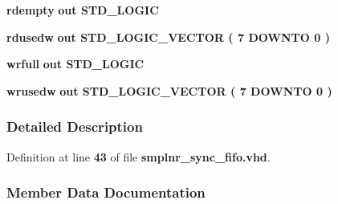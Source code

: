 \begin{DoxyCompactItemize}
\item 
{\bf rdempty}  {\bfseries {\bfseries \textcolor{keywordflow}{out}\textcolor{vhdlchar}{ }}} {\bfseries \textcolor{comment}{S\+T\+D\+\_\+\+L\+O\+G\+IC}\textcolor{vhdlchar}{ }} 
\item 
{\bf rdusedw}  {\bfseries {\bfseries \textcolor{keywordflow}{out}\textcolor{vhdlchar}{ }}} {\bfseries \textcolor{comment}{S\+T\+D\+\_\+\+L\+O\+G\+I\+C\+\_\+\+V\+E\+C\+T\+OR}\textcolor{vhdlchar}{ }\textcolor{vhdlchar}{(}\textcolor{vhdlchar}{ }\textcolor{vhdlchar}{ } \textcolor{vhdldigit}{7} \textcolor{vhdlchar}{ }\textcolor{keywordflow}{D\+O\+W\+N\+TO}\textcolor{vhdlchar}{ }\textcolor{vhdlchar}{ } \textcolor{vhdldigit}{0} \textcolor{vhdlchar}{ }\textcolor{vhdlchar}{)}\textcolor{vhdlchar}{ }} 
\item 
{\bf wrfull}  {\bfseries {\bfseries \textcolor{keywordflow}{out}\textcolor{vhdlchar}{ }}} {\bfseries \textcolor{comment}{S\+T\+D\+\_\+\+L\+O\+G\+IC}\textcolor{vhdlchar}{ }} 
\item 
{\bf wrusedw}  {\bfseries {\bfseries \textcolor{keywordflow}{out}\textcolor{vhdlchar}{ }}} {\bfseries \textcolor{comment}{S\+T\+D\+\_\+\+L\+O\+G\+I\+C\+\_\+\+V\+E\+C\+T\+OR}\textcolor{vhdlchar}{ }\textcolor{vhdlchar}{(}\textcolor{vhdlchar}{ }\textcolor{vhdlchar}{ } \textcolor{vhdldigit}{7} \textcolor{vhdlchar}{ }\textcolor{keywordflow}{D\+O\+W\+N\+TO}\textcolor{vhdlchar}{ }\textcolor{vhdlchar}{ } \textcolor{vhdldigit}{0} \textcolor{vhdlchar}{ }\textcolor{vhdlchar}{)}\textcolor{vhdlchar}{ }} 
\end{DoxyCompactItemize}


\subsubsection{Detailed Description}


Definition at line {\bf 43} of file {\bf smplnr\+\_\+sync\+\_\+fifo.\+vhd}.



\subsubsection{Member Data Documentation}
\paragraph[{ all }]{\hspace{0.3cm}{\ttfamily [Package]}}\label{classsmplnr__sync__fifo_a470a86ce8776f637b0483eabf2d92ad2}


